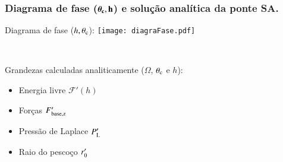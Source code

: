 \documentclass[8pt]{beamer}
\begin{document}
\begin{frame}
\begin{block}
	\end{block}
\end{frame}

\begin{frame}
\frametitle{\textbf{Diagrama de fase ($\mathbf{\boldsymbol{\theta_{\rm c}},h}$)} e \textbf{solução analítica} da ponte SA.}
	\begin{minipage}{0.6\textwidth}
		\begin{center}
			\hspace{1cm} {Diagrama de fase ($h,\theta_{\rm c}$):}		
			\texttt{[image: diagraFase.pdf]}
		\end{center}
	\end{minipage}
    ~~~~~~~~~
	\begin{minipage}{0.31\textwidth}
		\begin{block}{\small Grandezas calculadas analiticamente ($\Omega$, $\theta_{\rm c}$ e $h$):}
			\begin{itemize}
				\item \small Energia livre $\mathcal F{}' (h)$
				\item Forças $F{}'_{\rm base,z}$
				\item Pressão de Laplace $P{}'_{\rm L}$
				\item Raio do pescoço $r{}'_{\rm 0}$
			\end{itemize}
		\end{block}
	\end{minipage}
\end{frame}
\end{document}
